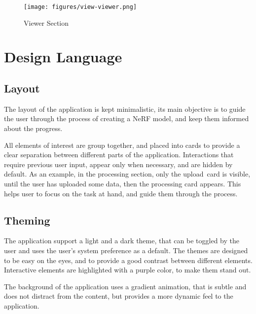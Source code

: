 \begin{figure}[htb]
  \texttt{[image: figures/view-viewer.png]}
  \caption{Viewer Section}
  \label{fig:design:viewer-section}
\end{figure}

\section{Design Language}

\subsection*{Layout}

The layout of the application is kept minimalistic, its main objective is to guide the user through the process of creating a NeRF model, and keep them informed about the progress.

All elements of interest are group together, and placed into cards to provide a clear separation between different parts of the application.
Interactions that require previous user input, appear only when necessary, and are hidden by default.
As an example, in the processing section, only the upload card is visible, until the user has uploaded some data, then the processing card appears.
This helps user to focus on the task at hand, and guide them through the process.

\subsection*{Theming}

The application support a light and a dark theme, that can be toggled by the user and uses the user's system preference as a default.
The themes are designed to be easy on the eyes, and to provide a good contrast between different elements.
Interactive elements are highlighted with a purple color, to make them stand out.

The background of the application uses a gradient animation, that is subtle and does not distract from the content, but provides a more dynamic feel to the application.
